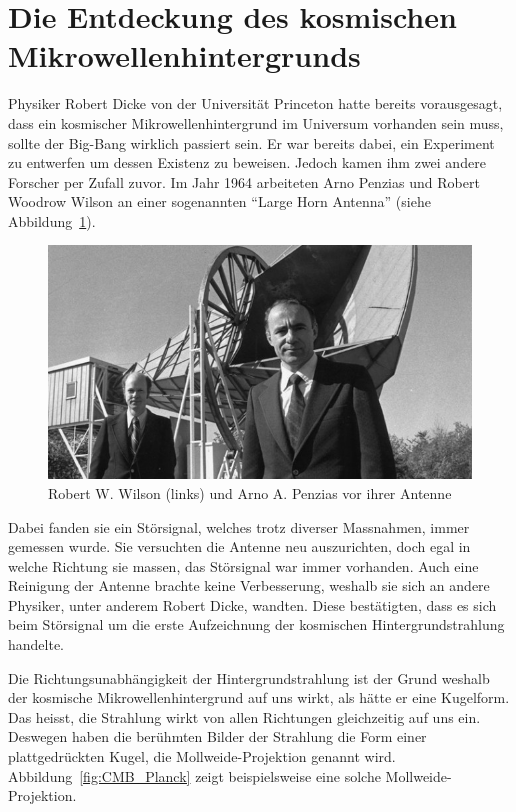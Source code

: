 \section{Die Entdeckung des kosmischen Mikrowellenhintergrunds}
Physiker Robert Dicke von der Universität Princeton hatte bereits vorausgesagt, 
dass ein kosmischer Mikrowellenhintergrund im Universum vorhanden sein muss, 
sollte der Big-Bang wirklich passiert sein. Er war bereits dabei, ein 
Experiment zu entwerfen um dessen Existenz zu beweisen. Jedoch kamen ihm zwei 
andere Forscher per Zufall zuvor.
Im Jahr 1964 arbeiteten Arno Penzias und Robert Woodrow Wilson an einer 
sogenannten ``Large Horn Antenna'' (siehe Abbildung~\ref{fig:wilson_penzias}).
\begin{figure}
	\centering
	\includegraphics[width=\linewidth]{cmb/images/penzias-wilson-large-horn-antenna.jpg}
	\caption{Robert W. Wilson (links) und Arno A. Penzias vor ihrer Antenne}
	\label{fig:wilson_penzias}
\end{figure}
Dabei fanden sie ein Störsignal, welches trotz diverser Massnahmen, immer 
gemessen wurde.
Sie versuchten die Antenne neu auszurichten, doch egal in welche Richtung sie 
massen, das Störsignal war immer vorhanden.
Auch eine Reinigung der Antenne brachte keine Verbesserung, weshalb sie sich an 
andere Physiker, unter anderem Robert Dicke, wandten. Diese bestätigten, dass 
es sich beim Störsignal um die erste Aufzeichnung der kosmischen 
Hintergrundstrahlung handelte.

Die Richtungsunabhängigkeit der Hintergrundstrahlung ist der Grund weshalb der 
kosmische Mikrowellenhintergrund auf uns wirkt, als hätte er eine Kugelform. 
Das heisst, die Strahlung wirkt von allen Richtungen gleichzeitig auf uns ein.
Deswegen haben die berühmten Bilder der Strahlung die Form einer 
plattgedrückten Kugel, die Mollweide-Projektion genannt wird. 
Abbildung~\ref{fig:CMB_Planck} zeigt beispielsweise eine solche 
Mollweide-Projektion.

